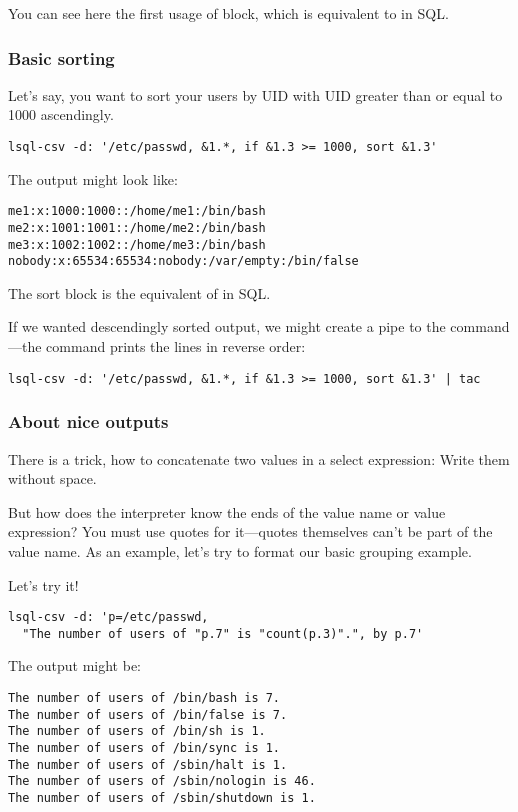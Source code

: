 You can see here the first usage of  block, which is equivalent to  in SQL.

\subsubsection{Basic sorting}
Let's say, you want to sort your users by UID with UID greater than or equal to 1000 ascendingly.
\begin{verbatim}
lsql-csv -d: '/etc/passwd, &1.*, if &1.3 >= 1000, sort &1.3'
\end{verbatim}
The output might look like:
\begin{verbatim}
me1:x:1000:1000::/home/me1:/bin/bash
me2:x:1001:1001::/home/me2:/bin/bash
me3:x:1002:1002::/home/me3:/bin/bash
nobody:x:65534:65534:nobody:/var/empty:/bin/false
\end{verbatim}

The sort block is the equivalent of  in SQL.

If we wanted descendingly sorted output, we might create a pipe to the  command---the  command prints the lines in reverse order:
\begin{verbatim}
lsql-csv -d: '/etc/passwd, &1.*, if &1.3 >= 1000, sort &1.3' | tac
\end{verbatim}

\subsubsection{About nice outputs}
There is a trick, how to concatenate two values in a select expression: Write them without space.

But how does the interpreter know the ends of the value name or value expression? You must use quotes for it---quotes themselves can't be part of the value name.
As an example, let's try to format our basic grouping example.

Let's try it!
\begin{verbatim}
lsql-csv -d: 'p=/etc/passwd, 
  "The number of users of "p.7" is "count(p.3)".", by p.7'
\end{verbatim}
The output might be:
\begin{verbatim}
The number of users of /bin/bash is 7.
The number of users of /bin/false is 7.
The number of users of /bin/sh is 1.
The number of users of /bin/sync is 1.
The number of users of /sbin/halt is 1.
The number of users of /sbin/nologin is 46.
The number of users of /sbin/shutdown is 1.
\end{verbatim}


